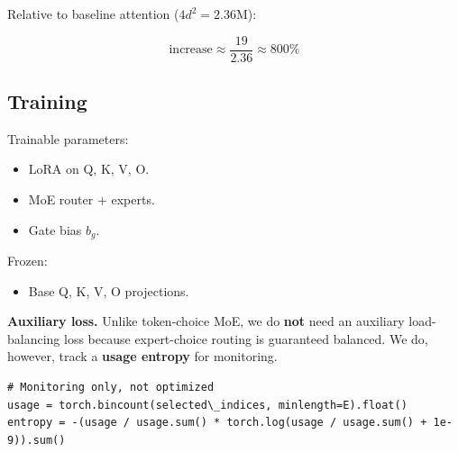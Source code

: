 Relative to baseline attention ($4 d^2 = 2.36$M):

\[
\text{increase} \approx \frac{19}{2.36} \approx 800\%
\tag{4.15}
\]

\subsection{Training}

Trainable parameters:

\begin{itemize}
\item LoRA on Q, K, V, O.
\item MoE router + experts.
\item Gate bias $b_g$.

\end{itemize}
Frozen:

\begin{itemize}
\item Base Q, K, V, O projections.

\end{itemize}
\textbf{Auxiliary loss.} Unlike token-choice MoE, we do \textbf{not} need an 
auxiliary load-balancing loss because expert-choice routing is guaranteed 
balanced. We do, however, track a \textbf{usage entropy} for monitoring.

\begin{lstlisting}
# Monitoring only, not optimized
usage = torch.bincount(selected\_indices, minlength=E).float()
entropy = -(usage / usage.sum() * torch.log(usage / usage.sum() + 1e-9)).sum()
\end{lstlisting}

